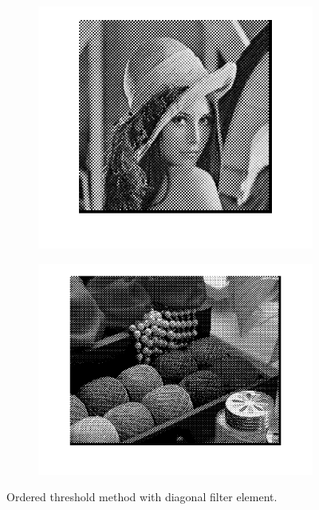 \documentclass{article}
\begin{document}
 \begin{figure}
        \centering
        \begin{subfigure}[b]{0.49\textwidth}
            \includegraphics[width=\textwidth]{Images/lena_diagonal_ordered.png}
        \end{subfigure}
        \begin{subfigure}[b]{0.49\textwidth}
            \includegraphics[width=\textwidth]{Images/wool_diagonal_ordered.png}
        \end{subfigure}
        \caption{Ordered threshold method with diagonal filter element.}
        \label{fig:diagonal_ordered}
\end{figure}
\end{document}
